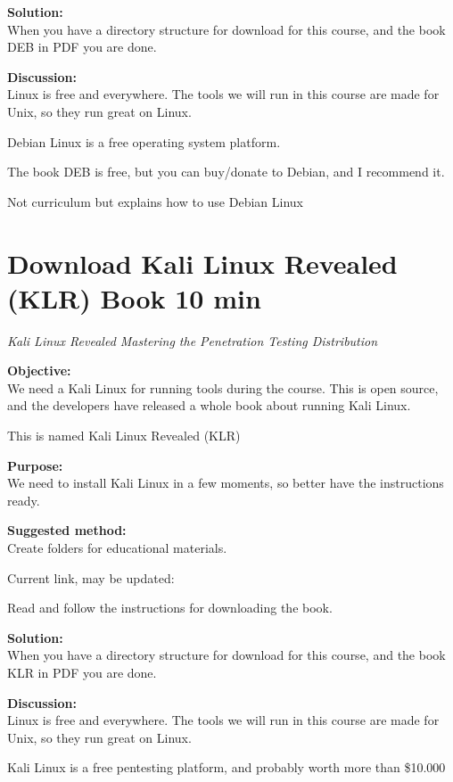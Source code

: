 \documentclass[a4paper,11pt,notitlepage]{report}
\begin{document}
{\bf Solution:}\\
When you have a directory structure for download for this course, and the book DEB in PDF you are done.

{\bf Discussion:}\\
Linux is free and everywhere. The tools we will run in this course are made for Unix, so they run great on Linux.

Debian Linux is a free operating system platform.

The book DEB is free, but you can buy/donate to Debian, and I recommend it.

Not curriculum but explains how to use Debian Linux



\chapter{Download Kali Linux Revealed (KLR) Book 10 min}
\label{ex:sw-downloadKLR}



\emph{Kali Linux Revealed  Mastering the Penetration Testing Distribution}


{\bf Objective:}\\
We need a Kali Linux for running tools during the course. This is open source, and the developers have released a whole book about running Kali Linux.

This is named Kali Linux Revealed (KLR)

{\bf Purpose:}\\
We need to install Kali Linux in a few moments, so better have the instructions ready.

{\bf Suggested method:}\\
Create folders for educational materials.

Current link, may be updated:\\

Read and follow the instructions for downloading the book.

{\bf Solution:}\\
When you have a directory structure for download for this course, and the book KLR in PDF you are done.

{\bf Discussion:}\\
Linux is free and everywhere. The tools we will run in this course are made for Unix, so they run great on Linux.

Kali Linux is a free pentesting platform, and probably worth more than \$10.000
\end{document}
